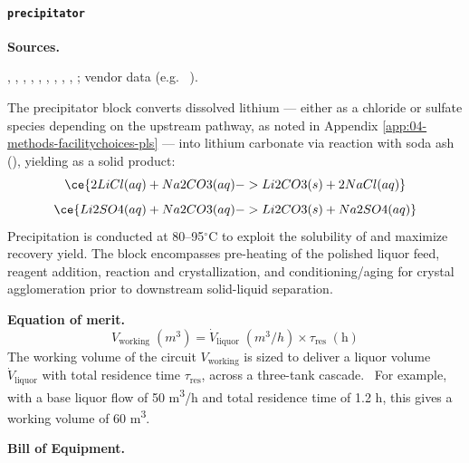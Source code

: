 \clearpage
\paragraph{\texttt{precipitator}}\label{app:04-methods-blockdefs-precipitator}
\noindent\textbf{Sources.}\quad

\citet{battagliaRecoveryLithiumCarbonate2022}, \citet{liuProcessAnalysisStudy2021}, \citet{khakmardanLifeCycleAssessment2024}, \citet{iyerLifecycleAnalysisLithium2024}, \citet{royLithiumClayAssessing2024}, \citet{sgscanadaincSK1300Technical2024}, \citet{samariMineralResourceEstimate2024}, \citet{srkconsultingSECTechnicalReport2023a}, \citet{ausimmMonograph27Cost}, \citet{petersPlantDesignEconomics1991}; vendor data (e.g. ~\citet{baguleyMixtechAustraliaFluid2009}).

The precipitator block converts dissolved lithium --- either as a chloride or sulfate species depending on the upstream pathway, as noted in Appendix \ref{app:04-methods-facilitychoices-pls} --- into lithium carbonate via reaction with soda ash (), yielding  as a solid product:
\begin{equation}
    \ce{2LiCl(aq) + Na2CO3(aq) -> Li2CO3(s) + 2NaCl(aq)}
\end{equation}
\begin{equation}
    \ce{Li2SO4(aq) + Na2CO3(aq) -> Li2CO3(s) + Na2SO4(aq)}
\end{equation}
Precipitation is conducted at 80--95$^\circ$C to exploit the solubility of  and maximize recovery yield. The block encompasses pre-heating of the polished liquor feed, reagent addition, reaction and crystallization, and conditioning/aging for crystal agglomeration prior to downstream solid-liquid separation.

\medskip
\noindent\textbf{Equation of merit.}\quad
\[
    V_\text{working}\;(\si{m^3}) = \dot{V}_\text{liquor}\;(\si{m^3}/h) \times \tau_\text{res}\;(\text{h})
\]
The working volume of the circuit $V_\text{working}$ is sized to deliver a liquor volume $\dot{V}_\text{liquor}$ with total residence time $\tau_\text{res}$, across a three-tank cascade.~\cite{srkconsultingSECTechnicalReport2023a} For example, with a base liquor flow of 50 \si{m^3/h} and total residence time of 1.2 h, this gives a working volume of 60 \si{m^3}. 

\medskip
\noindent\textbf{Bill of Equipment.}\quad
 
